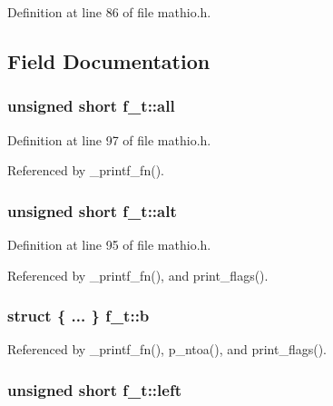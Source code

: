Definition at line 86 of file mathio.\+h.



\subsection{Field Documentation}
\subsubsection[{\texorpdfstring{all}{all}}]{\setlength{\rightskip}{0pt plus 5cm}unsigned short f\+\_\+t\+::all}\hypertarget{unionf__t_aab0615c9ada80b0f986b58639ea8c480}{}\label{unionf__t_aab0615c9ada80b0f986b58639ea8c480}


Definition at line 97 of file mathio.\+h.



Referenced by \+\_\+printf\+\_\+fn().

\subsubsection[{\texorpdfstring{alt}{alt}}]{\setlength{\rightskip}{0pt plus 5cm}unsigned short f\+\_\+t\+::alt}\hypertarget{unionf__t_a907a8d8af4803c9a18bc0586d22d6881}{}\label{unionf__t_a907a8d8af4803c9a18bc0586d22d6881}


Definition at line 95 of file mathio.\+h.



Referenced by \+\_\+printf\+\_\+fn(), and print\+\_\+flags().

\subsubsection[{\texorpdfstring{b}{b}}]{\setlength{\rightskip}{0pt plus 5cm}struct \{ ... \}   f\+\_\+t\+::b}\hypertarget{unionf__t_a37c0016009ff1f7ab1ef6697d9024a19}{}\label{unionf__t_a37c0016009ff1f7ab1ef6697d9024a19}


Referenced by \+\_\+printf\+\_\+fn(), p\+\_\+ntoa(), and print\+\_\+flags().

\subsubsection[{\texorpdfstring{left}{left}}]{\setlength{\rightskip}{0pt plus 5cm}unsigned short f\+\_\+t\+::left}\hypertarget{unionf__t_a5f89cd6194ccc6a288f1fe31d39b2e64}{}\label{unionf__t_a5f89cd6194ccc6a288f1fe31d39b2e64}


